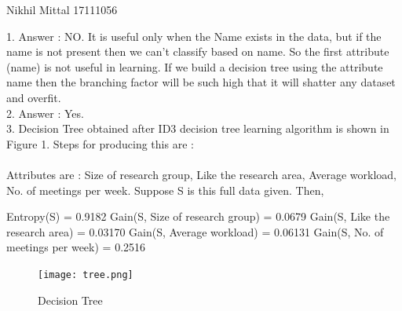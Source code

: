 \documentclass[a4paper,11pt]{article}
\begin{document}
								{Nikhil Mittal}      						           		%
								{17111056}																		%

\begin{mlsolution}

1. Answer : NO. It is useful only when the Name exists in the data, but if the name is not present then we can't classify based on name. So the first attribute (name) is not useful in learning.
If we build a decision tree using the attribute name then the branching factor will be such high that it will shatter any dataset and overfit.
\\

2. Answer : Yes.\\

3. Decision Tree obtained after ID3 decision tree learning algorithm is shown in Figure 1. Steps for producing this are :
\\\\Attributes are : Size of research group, Like the research area, Average workload, No. of meetings  per week. Suppose S is this full data given. Then, 

Entropy(S) = 0.9182
Gain(S, Size of research group) = 0.0679
Gain(S, Like the research area) = 0.03170
Gain(S, Average workload) = 0.06131
Gain(S, No. of meetings  per week) = 0.2516

\begin{figure}[th]%
\centering
\texttt{[image: tree.png]}%

\caption{Decision Tree}%
\label{fig:proto}%
\end{figure}



\end{mlsolution}
\end{document}

